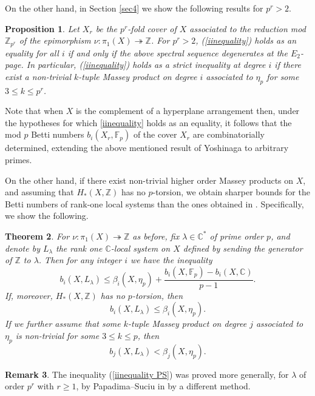 \documentclass[12pt,leqno,twoside]{amsart}
\theoremstyle{plain}
\newtheorem{theorem}{Theorem}[section]
\newtheorem{prop}[theorem]{Proposition}
\theoremstyle{definition}
\newtheorem{rmk}[theorem]{Remark}
\newcommand{\C}{\mathbb{C}}
\newcommand{\Z}{\mathbb{Z}}
\newcommand{\F}{\mathbb{F}}
\begin{document}
On the other hand, in Section \ref{sec4} we show the following results for $p^r>2$. 
\begin{prop}\label{cor2i} Let $X_r$ be the $p^r$-fold cover of $X$ associated to the reduction mod $\Z_{p^r}$ of the epimorphism $\nu\colon \pi_1(X)\twoheadrightarrow \Z$.
    For $p^r>2$,  (\ref{iinequality}) holds as an equality for all $i$ if and only if the above spectral sequence degenerates at the $E_2$-page. In particular, (\ref{iinequality}) holds as a strict inequality at degree $i$ if there exist a non-trivial $k$-tuple Massey product on degree $i$ associated to $\eta_p$ for some  $3\leq k\leq p^r$.
\end{prop}

Note that when $X$ is the complement of a hyperplane arrangement then, under the hypotheses for which \eqref{iinequality} holds as an equality, it follows that the mod $p$ Betti numbers $b_i(X_r,\F_p)$ of the cover $X_r$ are combinatorially determined, extending the above mentioned result of Yoshinaga to arbitrary primes. 

On the other hand, if there exist non-trivial higher order Massey products on $X$, and assuming that $H_*(X,\Z)$ has no $p$-torsion, we obtain sharper bounds for the 
Betti numbers of rank-one local systems than the ones 
obtained in \cite{PS10}. Specifically, we  show the following.
\begin{theorem}\label{thm inequality} 
For $\nu\colon \pi_1(X)\twoheadrightarrow \Z$  as before, fix  $\lambda\in \C^*$ of prime order $p$, and denote by $L_\lambda$ the rank one $\C$-local system on $X$ defined by sending the generator of $\Z$ to $\lambda$.  Then for any integer $i$ we have the inequality
\begin{equation}\label{iineq} b_i(X,L_\lambda)\leq \beta_i(X,\eta_p)+\dfrac{b_i(X,\F_p)-b_i(X,\C)}{p-1}.\end{equation}
If, moreover, $H_*(X,\Z)$  has no $p$-torsion, then 
\begin{equation} \label{iinequality PS}
   b_i(X,L_\lambda)\leq \beta_i(X,\eta_p). 
\end{equation} 
If we further assume that some $k$-tuple Massey product on degree $j$ associated to $\eta_p$ is non-trivial for some  $3\leq k\leq p$, then 
\begin{equation} \label{iinequality sharper pS}
   b_j(X,L_\lambda)< \beta_j(X,\eta_p). 
\end{equation} 
 \end{theorem}
\begin{rmk} The inequality (\ref{iinequality PS}) was proved more generally, for $\lambda$ of order $p^r$ with $r\geq 1$, by Papadima--Suciu in \cite[Theorem C]{PS10} by a different method. 
\end{rmk}
\end{document}
